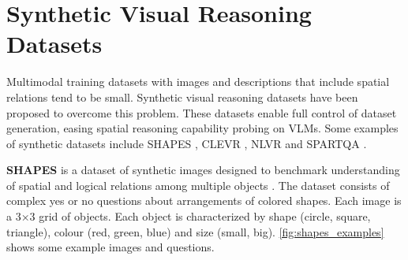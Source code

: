 \section{Synthetic Visual Reasoning Datasets} \label{sec:synthetic_visual_reasoning_datasets}

Multimodal training datasets with images and descriptions that include spatial relations tend to be small. Synthetic visual reasoning datasets have been proposed to overcome this problem. These datasets enable full control of dataset generation, easing spatial reasoning capability probing  on VLMs. Some examples of synthetic datasets include SHAPES \cite{andreas2016neural}, CLEVR \cite{johnson2017clevr}, NLVR \cite{suhr-etal-2017-corpus} and SPARTQA \cite{mirzaee-etal-2021-spartqa}.

\textbf{SHAPES} is a dataset of synthetic images designed to benchmark understanding of spatial and logical relations among multiple objects \cite{andreas2016neural}. The dataset consists of complex yes or no questions about arrangements of colored shapes. Each image is a 3×3 grid of objects. Each object is characterized by shape (circle, square, triangle), colour (red, green, blue) and size (small, big). \cref{fig:shapes_examples} shows some example images and questions.

